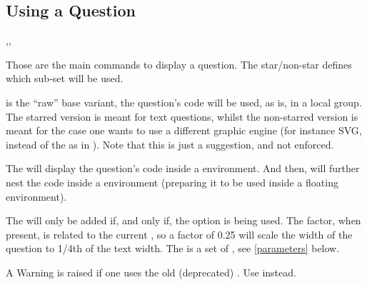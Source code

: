 \documentclass[10pt]{article}
\begin{document}
\subsection{Using a Question}\label{question use}
\begin{codedescribe}[code,update=2025/10/01]{\Question,\tikzQuestion,\ftikzQuestion}
\begin{codesyntax}%
\tsobj{\Question}
\tsobj{\tikzQuestion}
\tsobj{\ftikzQuestion}
\tsobj{\Question*}
\tsobj{\tikzQuestion*}
\tsobj{\ftikzQuestion*}
\end{codesyntax}
Those are the main commands to display a question. The star/non-star defines which sub-set  will be used. 

\tsobj{\Question} is the ``raw'' base variant, the question's code will be used, as is, in a local group. The starred version \tsobj{\Question*} is meant for text questions, whilst  the non-starred version \tsobj{\Question} is meant for the case one wants to use a different graphic engine (for instance SVG, instead of the  as in \tsobj{\tikzQuestion}). Note that this is just a suggestion, and not enforced.

The \tsobj{\tikzQuestion} will display the question's code inside a  environment. And then, \tsobj{\ftikzQuestion} will further nest the code inside a  environment (preparing it to be used inside a floating environment).

The  will only be added if, and only if, the  option is being used. The  factor, when present, is related to the current \tsobj{\textwidth}, so a factor of 0.25 will scale the width of the question to 1/4th of the text width. The  is a set of , see \ref{parameters} below.
\end{codedescribe}
\begin{tsremark}
  A Warning is raised if one uses the old (deprecated) \tsobj[code,sep=or]{\rawtikzQuestion,\textQuestion}. Use \tsobj{\Question} instead.
\end{tsremark}
\end{document}
